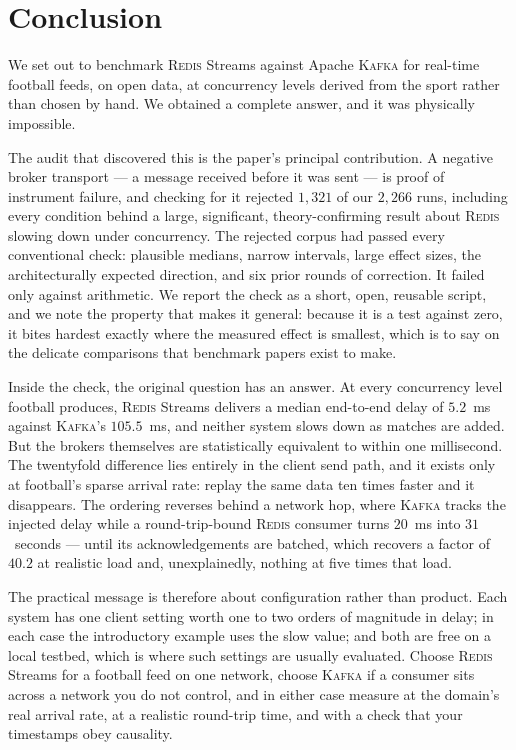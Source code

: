 \documentclass[Afour,sageh,times]{sagej}
\newcommand{\redis}{\textsc{Redis}}
\newcommand{\kafka}{\textsc{Kafka}}
\begin{document}
\section{Conclusion}
\label{sec:conclusion}

We set out to benchmark \redis{} Streams against Apache \kafka{} for real-time football feeds, on
open data, at concurrency levels derived from the sport rather than chosen by hand. We obtained a
complete answer, and it was physically impossible.

The audit that discovered this is the paper's principal contribution. A negative broker transport
--- a message received before it was sent --- is proof of instrument failure, and checking for it
rejected $1{,}321$ of our $2{,}266$ runs, including every condition behind a large, significant,
theory-confirming result about \redis{} slowing down under concurrency. The rejected corpus had
passed every conventional check: plausible medians, narrow intervals, large effect sizes, the
architecturally expected direction, and six prior rounds of correction. It failed only against
arithmetic. We report the check as a short, open, reusable script, and we note the property that
makes it general: because it is a test against zero, it bites hardest exactly where the measured
effect is smallest, which is to say on the delicate comparisons that benchmark papers exist to
make.

Inside the check, the original question has an answer. At every concurrency level football
produces, \redis{} Streams delivers a median end-to-end delay of $5.2$~ms against \kafka{}'s
$105.5$~ms, and neither system slows down as matches are added. But the brokers themselves are
statistically equivalent to within one millisecond. The twentyfold difference lies entirely in the
client send path, and it exists only at football's sparse arrival rate: replay the same data ten
times faster and it disappears. The ordering reverses behind a network hop, where \kafka{} tracks
the injected delay while a round-trip-bound \redis{} consumer turns $20$~ms into $31$~seconds ---
until its acknowledgements are batched, which recovers a factor of $40.2$ at realistic load and,
unexplainedly, nothing at five times that load.

The practical message is therefore about configuration rather than product. Each system has one
client setting worth one to two orders of magnitude in delay; in each case the introductory
example uses the slow value; and both are free on a local testbed, which is where such settings
are usually evaluated. Choose \redis{} Streams for a football feed on one network, choose \kafka{}
if a consumer sits across a network you do not control, and in either case measure at the
domain's real arrival rate, at a realistic round-trip time, and with a check that your timestamps
obey causality.
\end{document}
